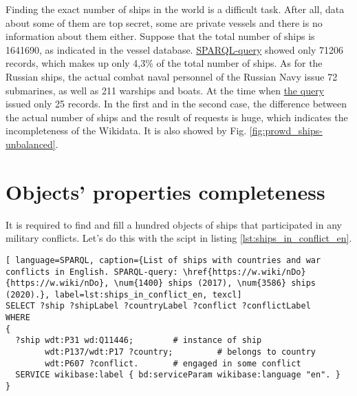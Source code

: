Finding the exact number of ships in the world is a difficult task. After all, data about some of them are top secret, some are private vessels and there is no information about them either. Suppose that the total number of ships is \num{1641690}, as indicated in the vessel database. \href{https://w.wiki/koU}{SPARQL-query} showed only \num{71206} records, which makes up only 4,3\%  of the total number of ships. As for the Russian ships, the actual combat naval personnel of the Russian Navy issue 72 submarines, as well as 211 warships and boats. At the time when \href{https://w.wiki/koS}{the query} issued only 25 records. In the first and in the second case, the difference between the actual number of ships and the result of requests is huge, which indicates the incompleteness of the Wikidata. It is also showed by Fig. \ref{fig:prowd_ships-unbalanced}.

\section{Objects' properties completeness}

It is required to find and fill a hundred objects of ships that participated in any military conflicts. Let's do this with the scipt in listing \ref{lst:ships_in_conflict_en}.
\begin{lstlisting}[ language=SPARQL, caption={List of ships with countries and war conflicts in English. SPARQL-query: \href{https://w.wiki/nDo}{https://w.wiki/nDo}, \num{1400} ships (2017), \num{3586} ships (2020).}, label=lst:ships_in_conflict_en, texcl]
SELECT ?ship ?shipLabel ?countryLabel ?conflict ?conflictLabel
WHERE
{
  ?ship wdt:P31 wd:Q11446;        # instance of ship
        wdt:P137/wdt:P17 ?country;         # belongs to country
        wdt:P607 ?conflict.       # engaged in some conflict
  SERVICE wikibase:label { bd:serviceParam wikibase:language "en". }
}
\end{lstlisting}


\label{question:ship_2}


